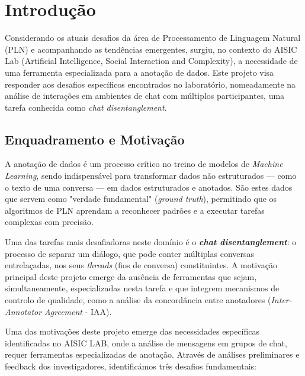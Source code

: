 \chapter{Introdução}
\label{cha:introducao}

Considerando os atuais desafios da área de Processamento de Linguagem Natural (PLN) e acompanhando as tendências emergentes, surgiu, no contexto do AISIC Lab (Artificial Intelligence, Social Interaction and Complexity), a necessidade de uma ferramenta especializada para a anotação de dados. Este projeto visa responder aos desafios específicos encontrados no laboratório, nomeadamente na análise de interações em ambientes de chat com múltiplos participantes, uma tarefa conhecida como \textit{chat disentanglement}.

\section{Enquadramento e Motivação}

A anotação de dados é um processo crítico no treino de modelos de \textit{Machine Learning}, sendo indispensável para transformar dados não estruturados — como o texto de uma conversa — em dados estruturados e anotados. São estes dados que servem como "verdade fundamental" (\textit{ground truth}), permitindo que os algoritmos de PLN aprendam a reconhecer padrões e a executar tarefas complexas com precisão.

Uma das tarefas mais desafiadoras neste domínio é o \textbf{\textit{chat disentanglement}}: o processo de separar um diálogo, que pode conter múltiplas conversas entrelaçadas, nos seus \textit{threads} (fios de conversa) constituintes. A motivação principal deste projeto emerge da ausência de ferramentas que sejam, simultaneamente, especializadas nesta tarefa e que integrem mecanismos de controlo de qualidade, como a análise da concordância entre anotadores (\textit{Inter-Annotator Agreement} - IAA).

Uma das motivações deste projeto emerge das necessidades específicas identificadas no AISIC LAB, onde a análise de mensagens em grupos de chat, requer ferramentas especializadas de anotação. 
Através de análises preliminares e feedback dos investigadores, identificámos três desafios fundamentais:

